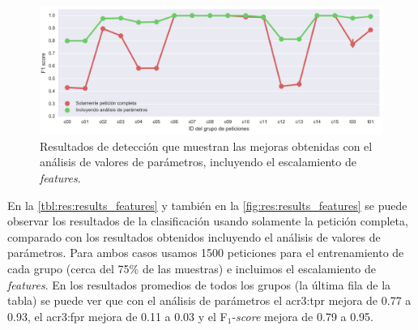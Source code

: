 \begin{figure}[hbt]
    \centering
    \includegraphics[width=\linewidth]{images/results-features.png}

    \caption{Resultados de detección que muestran las mejoras obtenidas
        con el análisis de valores de parámetros, incluyendo el escalamiento
        de \textit{features}.}
    \label{fig:res:results_features}
\end{figure}

En la \autoref{tbl:res:results_features} y también en la
\autoref{fig:res:results_features} se puede observar los resultados de
la clasificación usando solamente la petición completa, comparado con
los resultados obtenidos incluyendo el análisis de valores de parámetros.
Para ambos casos usamos 1500 peticiones para el entrenamiento de cada
grupo (cerca del 75\% de las muestras) e incluimos el escalamiento de
\textit{features}.
En los resultados promedios de todos los grupos (la última fila de la
tabla) se puede ver que con el análisis de parámetros el \gls{acr3:tpr}
mejora de \num{0.77} a \num{0.93}, el \gls{acr3:fpr} mejora de \num{0.11}
a \num{0.03} y el F$_{1}$-\textit{score} mejora de \num{0.79} a \num{0.95}.

